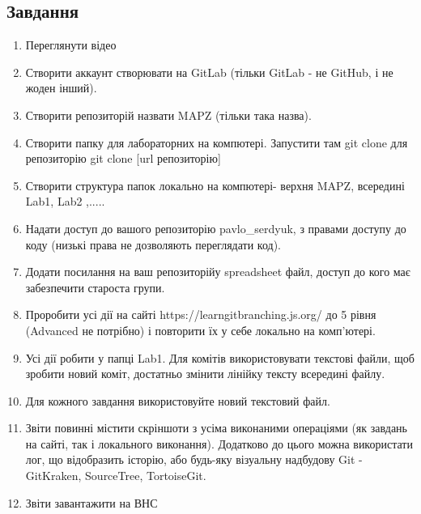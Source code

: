 \documentclass[oneside,14pt]{extarticle}
\begin{document}
\begin{normalsize}
	\section*{Завдання}
	\begin{enumerate}
		\item Переглянути відео
		
		\item Створити аккаунт створювати на GitLab (тільки GitLab - не GitHub, і не жоден
		інший).
		
		\item Створити репозиторій назвати MAPZ (тільки така назва).
		
		\item Створити папку для лабораторних на компютері. Запустити там git clone для
		репозиторію
		git clone [url репозиторію]
		
		\item Створити структура папок локально на компютері- верхня MAPZ, всередині
		Lab1, Lab2 ,.....
		
		\item Надати доступ до вашого репозиторію pavlo\_serdyuk, з правами доступу до
		коду (низькі права не дозволяють переглядати код).
		
		\item Додати посилання на ваш репозиторійу spreadsheet файл, доступ до кого має
		забезпечити староста групи.
		
		\item Проробити усі дії на сайті https://learngitbranching.js.org/ до 5 рівня (Advanced
		не потрібно) і повторити їх у себе локально на комп’ютері.
		
		\item Усі дії робити у папці Lab1. Для комітів використовувати текстові файли, щоб
		зробити новий коміт, достатньо змінити лінійку тексту всередині файлу.
		
		\item Для кожного завдання використовуйте новий текстовий файл.
		
		\item Звіти повинні містити скріншоти з усіма виконаними операціями (як завдань на
		сайті, так і локального виконання). Додатково до цього можна використати лог,
		що відобразить історію, або будь-яку візуальну надбудову Git - GitKraken,
		SourceTree, TortoiseGit.
		
		\item Звіти завантажити на ВНС
	\end{enumerate}


\end{normalsize}
\end{document}
